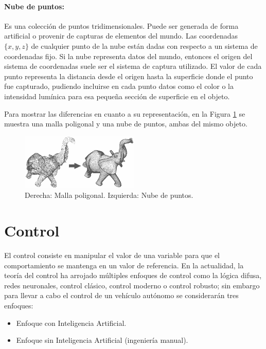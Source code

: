 \paragraph{Nube de puntos:} Es una colección de puntos tridimensionales. Puede ser generada de forma artificial o provenir de capturas de elementos del mundo. Las coordenadas $\{x, y, z\}$ de cualquier punto de la nube están dadas con respecto a un sistema de coordenadas fijo. Si la nube representa datos del mundo, entonces el origen del sistema de coordenadas suele ser el sistema de captura utilizado. El valor de cada punto representa la distancia desde el origen hasta la superficie donde el punto fue capturado, pudiendo incluirse en cada punto datos como el color o la intensidad lumínica para esa pequeña sección de superficie en el objeto.
\par Para mostrar las diferencias en cuanto a su representación, en la Figura \ref{fig:elef} se muestra una malla poligonal y una nube de puntos, ambas del mismo objeto.
\begin{figure}[htbp!]
	\centering
	\includegraphics[width=0.5\textwidth]{./Figuras/Elefante}
	\caption{Derecha: Malla poligonal. Izquierda: Nube de puntos.}
	\label{fig:elef}
\end{figure}
\section{Control}
\label{sec:con}
El control consiste en manipular el valor de una variable para que el comportamiento se mantenga en un valor de referencia. En la actualidad, la teoría del control ha arrojado múltiples enfoques de control como la lógica difusa, redes neuronales, control clásico, control moderno o control robusto; sin embargo para llevar a cabo el control de un vehículo autónomo se considerarán tres enfoques:
\begin{itemize}
	\item Enfoque con Inteligencia Artificial.
	\item Enfoque sin Inteligencia Artificial (ingeniería manual).
\end{itemize}

